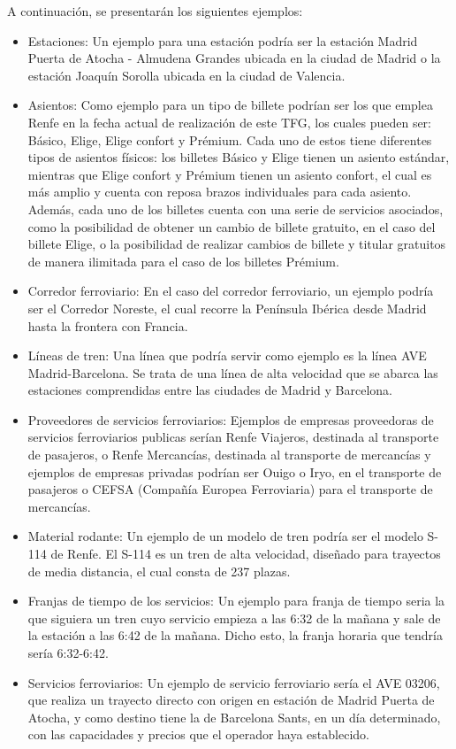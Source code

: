 A continuación, se presentarán los siguientes ejemplos:
    \begin{itemize}
        \item Estaciones: Un ejemplo para una estación podría ser la estación Madrid Puerta de Atocha - Almudena Grandes ubicada en la ciudad de Madrid o la estación Joaquín Sorolla ubicada en la ciudad de Valencia.
        \item Asientos: Como ejemplo para un tipo de billete podrían ser los que emplea Renfe en la fecha actual de realización de este \acrshort{TFG}, los cuales pueden ser: Básico, Elige, Elige confort y Prémium. Cada uno de estos tiene diferentes tipos de asientos físicos: los billetes Básico y Elige tienen un asiento estándar, mientras que Elige confort y Prémium tienen un asiento confort, el cual es más amplio y cuenta con reposa brazos individuales para cada asiento. Además, cada uno de los billetes cuenta con una serie de servicios asociados, como la posibilidad de obtener un cambio de billete gratuito, en el caso del billete Elige, o la posibilidad de realizar cambios de billete y titular gratuitos de manera ilimitada para el caso de los billetes Prémium.
        \item Corredor ferroviario: En el caso del corredor ferroviario, un ejemplo podría ser el Corredor Noreste, el cual recorre la Península Ibérica desde Madrid hasta la frontera con Francia. 
        \item Líneas de tren: Una línea que podría servir como ejemplo es la línea AVE Madrid-Barcelona. Se trata de una línea de alta velocidad que se abarca las estaciones comprendidas entre las ciudades de Madrid y Barcelona.
        \item Proveedores de servicios ferroviarios: Ejemplos de empresas proveedoras de servicios ferroviarios publicas serían Renfe Viajeros, destinada al transporte de pasajeros, o Renfe Mercancías, destinada al transporte de mercancías y ejemplos de empresas privadas podrían ser Ouigo o Iryo, en el transporte de pasajeros o CEFSA (Compañía Europea Ferroviaria) para el transporte de mercancías.
        \item Material rodante: Un ejemplo de un modelo de tren podría ser el modelo S-114 de Renfe. El S-114 es un tren de alta velocidad, diseñado para trayectos de media distancia, el cual consta de 237 plazas.
        \item Franjas de tiempo de los servicios: Un ejemplo para franja de tiempo seria la que siguiera un tren cuyo servicio empieza a las 6:32 de la mañana y sale de la estación a las 6:42 de la mañana. Dicho esto, la franja horaria que tendría sería 6:32-6:42.
        \item Servicios ferroviarios: Un ejemplo de servicio ferroviario sería el AVE 03206, que realiza un trayecto directo con origen en estación de Madrid Puerta de Atocha, y como destino tiene la de Barcelona Sants, en un día determinado, con las capacidades y precios que el operador haya establecido.
    \end{itemize}


